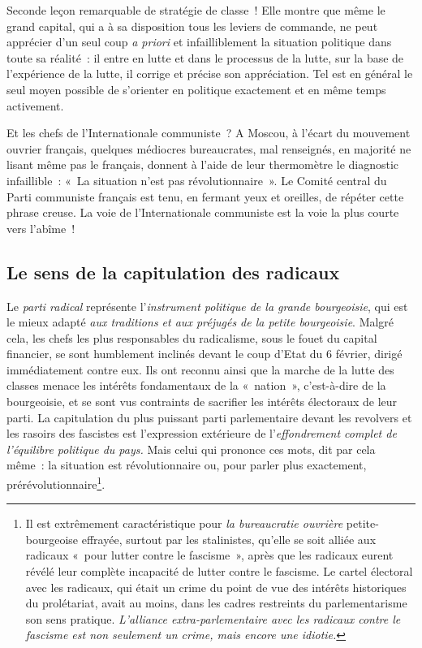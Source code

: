 \documentclass[french,twoside]{book} %
\begin{document}
Seconde leçon remarquable de stratégie de classe ! Elle montre que même le grand capital, qui a à sa disposition tous les leviers de commande, ne peut apprécier d’un seul coup \emph{a priori} et infailliblement la situation politique dans toute sa réalité : il entre en lutte et dans le processus de la lutte, sur la base de l’expérience de la lutte, il corrige et précise son appréciation. Tel est en général le seul moyen possible de s’orienter en politique exactement et en même temps activement.\par
Et les chefs de l’Internationale communiste ? A Moscou, à l’écart du mouvement ouvrier français, quelques médiocres bureaucrates, mal renseignés, en majorité ne  lisant même pas le français, donnent à l’aide de leur thermomètre le diagnostic infaillible : « La situation n’est pas révolutionnaire ». Le Comité central du Parti communiste français est tenu, en fermant yeux et oreilles, de répéter cette phrase creuse. La voie de l’Internationale communiste est la voie la plus courte vers l’abîme !
\subsection[{Le sens de la capitulation des radicaux}]{Le sens de la capitulation des radicaux}
\noindent Le \emph{parti radical} représente l’\emph{instrument politique de la grande bourgeoisie}, qui est le mieux adapté \emph{aux traditions et aux préjugés de la petite bourgeoisie}. Malgré cela, les chefs les plus responsables du radicalisme, sous le fouet du capital financier, se sont humblement inclinés devant le coup d’Etat du 6 février, dirigé immédiatement contre eux. Ils ont reconnu ainsi que la marche de la lutte des classes menace les intérêts fondamentaux de la « nation », c’est-à-dire de la bourgeoisie, et se sont vus contraints de sacrifier les intérêts électoraux de leur parti. La capitulation du plus puissant parti parlementaire devant les revolvers et les rasoirs des fascistes est l’expression extérieure de l’\emph{effondrement complet de l’équilibre politique du pays. }Mais celui qui prononce ces mots, dit par cela même : la situation est révolutionnaire ou, pour parler plus exactement, prérévolutionnaire\footnote{ \noindent Il est extrêmement caractéristique pour \emph{la bureaucratie ouvrière} petite-bourgeoise effrayée, surtout par les stalinistes, qu’elle se soit alliée aux radicaux « pour lutter contre le fascisme », après que les radicaux eurent révélé leur complète incapacité de lutter contre le fascisme. Le cartel électoral avec les radicaux, qui était un crime du point de vue des intérêts historiques du prolétariat, avait au moins, dans les cadres restreints du parlementarisme son sens pratique. \emph{L’alliance extra-parlementaire avec les radicaux contre le fascisme est non seulement un crime, mais encore une idiotie.}
 }.
\end{document}
